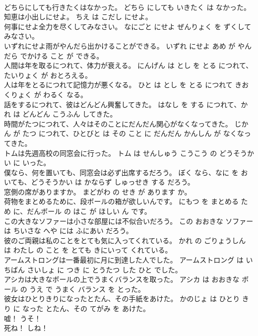 \documentclass[8pt]{extreport}
\begin{document}
\begin{CJK}{UTF8}{min}
\\	どちらにしても行きたくはなかった。	どちら にしても いきたく は なかった。	
\\	知恵は小出しにせよ。	ちえ は こだし にせよ。	
\\	何事にせよ全力を尽くしてみなさい。	なにごと にせよ ぜんりょく を ずくして みなさい。	
\\	いずれにせよ雨がやんだら出かけることができる。	いずれ にせよ あめ が やんだら でかける こと が できる。	
\\	人間は年を取るにつれて、体力が衰える。	にんげん は とし を とる につれて、たいりょく が おとろえる。	
\\	人は年をとるにつれて記憶力が悪くなる。	ひと は とし を とる につれて きおくりょく が わるく なる。	
\\	話をするにつれて、彼はどんどん興奮してきた。	はなし を する につれて、かれ は どんどん こうふん してきた。	
\\	時間がたつにつれて、人々はそのことにだんだん関心がなくなってきた。	じかん が たつ につれて、ひとびと は その こと に だんだん かんしん が なくなってきた。	
\\	トムは先週高校の同窓会に行った。	トム は せんしゅう こうこう の どうそうかい に いった。	
\\	僕なら、何を置いても、同窓会は必ず出席するだろう。	ぼく なら、なに を おいても、どうそうかい は かならず しゅっせき する だろう。	
\\	窓側の席がありますか。	まどがわ の せき が あります か。	
\\	荷物をまとめるために、段ボールの箱が欲しいんです。	にもつ を まとめる ため に、だんボール の はこ が ほしい ん です。	
\\	この大きなソファーは小さな部屋には不似合いだろう。	この おおきな ソファー は ちいさな へや には ふにあい だろう。	
\\	彼のご両親は私のことをとても気に入ってくれている。	かれ の ごりょうしん は わたし の こと を とても きにいって くれている。	
\\	アームストロングは一番最初に月に到達した人でした。	アームストロング は いちばん さいしょ に つき に とうたつ した ひと でした。	
\\	アシカは大きなボールの上でうまくバランスを取った。	アシカ は おおきな ボール の うえ で うまく バランス を とった。	
\\	彼女はひとりきりになったとたん、その手紙をあけた。	かのじょ は ひとり きり に なった とたん、その てがみ を あけた。	
\\	嘘！	うそ！	
\\	死ね！	しね！	

\end{CJK}
\end{document}
